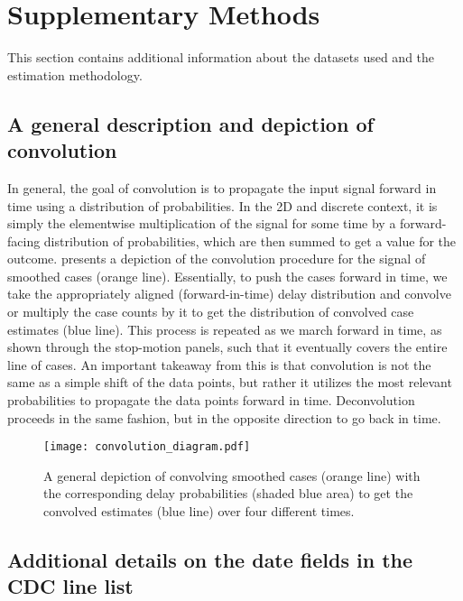 \section{Supplementary Methods}

This section contains additional information about the datasets used and the estimation methodology.

\subsection{A general description and depiction of convolution}
\label{supp:convol}

In general, the goal of convolution is to propagate the input signal forward in time using a distribution of probabilities. In the 2D and discrete context, it is simply the elementwise multiplication of the signal for some time by a forward-facing distribution of probabilities, which are then summed to get a value for the outcome.  presents a depiction of the convolution procedure for the signal of smoothed cases (orange line). Essentially, to push the cases forward in time, we take the appropriately aligned (forward-in-time) delay distribution and convolve or multiply the case counts by it to get the distribution of convolved case estimates (blue line). This process is repeated as we march forward in time, as shown through the stop-motion panels, such that it eventually covers the entire line of cases. An important takeaway from this is that convolution is not the same as a simple shift of the data points, but rather it utilizes the most relevant probabilities to propagate the data points forward in time. Deconvolution proceeds in the same fashion, but in the opposite direction to go back in time. 

\begin{figure}[H]
\centering
    \texttt{[image: convolution\_diagram.pdf]}
    \caption{A general depiction of convolving smoothed cases (orange line) with the corresponding delay probabilities (shaded blue area) to get the convolved estimates (blue line) over four different times.}
    \label{fig:convol}
\end{figure}

\subsection{Additional details on the date fields in the CDC line list}
\label{supp:linelist-details}

